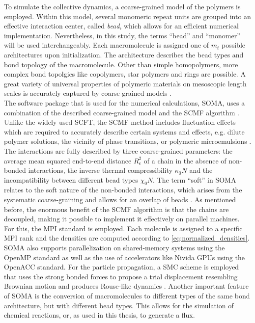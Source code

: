 \documentclass[bachelor,       %
               oneside,        %
               BCOR10mm,       %
               ngerman, english %
               ]{GAUBM}
\begin{document}
To simulate the collective dynamics, a coarse-grained model of the polymers is employed. Within this model, several monomeric repeat units are grouped into an effective interaction center, called \textit{bead}, which allows for an efficient numerical implementation. Nevertheless, in this study, the terms \enquote{bead} and \enquote{monomer} will be used interchangeably. Each macromolecule is assigned one of $m_t$ possible architectures upon initialization. The architecture describes the bead types and bond topology of the macromolecule. Other than simple homopolymers, more complex bond topolgies like copolymers, star polymers and rings are possible. A great variety of universal properties of polymeric materials on mesoscopic length scales is accurately captured by coarse-grained models \cite{Baschnagel03}.\\
The software package that is used for the numerical calculations, \ac{SOMA}, uses a combination of the described coarse-grained model and the \ac{SCMF} algorithm \cite{Daoulas06}. Unlike the widely used \ac{SCFT}, the \ac{SCMF} method includes fluctuation effects which are required to accurately describe certain systems and effects, e.g. dilute polymer solutions, the vicinity of phase transitions, or polymeric microemulsions \cite{Bates97, Mueller02, Schmid03}. The interactions are fully described by three coarse-grained parameters: the average mean squared end-to-end distance $R_{e}^2$ of a chain in the absence of non-bonded interactions, the inverse thermal compressibility $\kappa_0 N$ and the incompatibility between different bead types $\chi_0 N$. The term \enquote{soft} in \ac{SOMA} relates to the soft nature of the non-bonded interactions, which arises from the systematic coarse-graining and allows for an overlap of beads \cite{Mueller11soft}. As mentioned before, the enormous benefit of the \ac{SCMF} algorithm is that the chains are decoupled, making it possible to implement it effectively on parallel machines. For this, the \ac{MPI} standard is employed. Each molecule is assigned to a specific \ac{MPI} rank and the densities are computed according to \autoref{eq:normalized_densities}. \ac{SOMA} also supports parallelization on shared-memory systems using the OpenMP standard as well as the use of accelerators like Nivida \acp{GPU} \cite{Schneider_soma} using the OpenACC standard. For the particle propagation, a \ac{SMC} scheme is employed that uses the strong bonded forces to propose a trial displacement resembling Brownian motion and produces Rouse-like dynamics \cite{Pangali78,Rossky78}. Another important feature of \ac{SOMA} is the conversion of macromolecules to different types of the same bond architecture, but with different bead types. This allows for the simulation of chemical reactions, or, as used in this thesis, to generate a flux. \\
\end{document}
